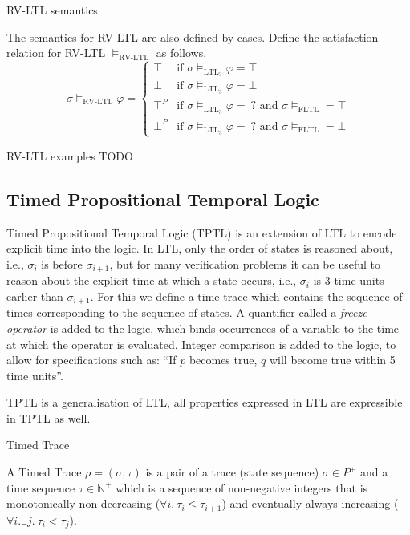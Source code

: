 \documentclass[a4paper]{article}
\newcommand{\tand}{\text{ and }}
\newcommand{\ltlt}{LTL$_3$}
\begin{document}
\begin{defn}{RV-LTL semantics}

  The semantics for RV-LTL are also defined by cases.
  Define the satisfaction relation for RV-LTL $\vDash_{\text{RV-LTL}}$ as follows.
  \[\sigma\vDash_{\text{RV-LTL}}\varphi =
    \begin{cases}
      \top & \text{if } \sigma \vDash_{\text{\ltlt}} \varphi = \top\\
      \bot & \text{if } \sigma \vDash_{\text{\ltlt}} \varphi = \bot\\
      \top^P & \text{if } \sigma \vDash_{\text{\ltlt}} \varphi = ~?\tand \sigma\vDash_{\text{FLTL}} = \top \\
      \bot^P & \text{if } \sigma \vDash_{\text{\ltlt}} \varphi = ~?\tand \sigma\vDash_{\text{FLTL}} = \bot
    \end{cases}
  \]
\end{defn}

\begin{eg}{RV-LTL examples}
  TODO
\end{eg}

\subsection{Timed Propositional Temporal Logic}
Timed Propositional Temporal Logic (TPTL)\autocite{alur1994really} is an extension of LTL to encode explicit time into the logic.
In LTL, only the order of states is reasoned about, i.e., $\sigma_i$ is before $\sigma_{i+1}$, but for many verification problems it can be useful to reason about the explicit time at which a state occurs, i.e., $\sigma_i$ is 3 time units earlier than $\sigma_{i+1}$.
For this we define a time trace which contains the sequence of times corresponding to the sequence of states.
A quantifier called a \emph{freeze operator} is added to the logic, which binds occurrences of a variable to the time at which the operator is evaluated.
Integer comparison is added to the logic, to allow for specifications such as: ``If $p$ becomes true, $q$ will become true within 5 time units''.

TPTL is a generalisation of LTL, all properties expressed in LTL are expressible in TPTL as well.



\begin{defn}{Timed Trace}

  A Timed Trace $\rho = (\sigma,\tau)$ is a pair of a trace (state sequence) $\sigma \in P^+$ and a time sequence $\tau \in \mathbb{N}^+$ which is a sequence of non-negative integers that is monotonically non-decreasing ($\forall i. ~\tau_i \leq \tau_{i+1}$) and eventually always increasing ($\forall i. \exists j. ~\tau_i < \tau_j$).
\end{defn}
\end{document}
